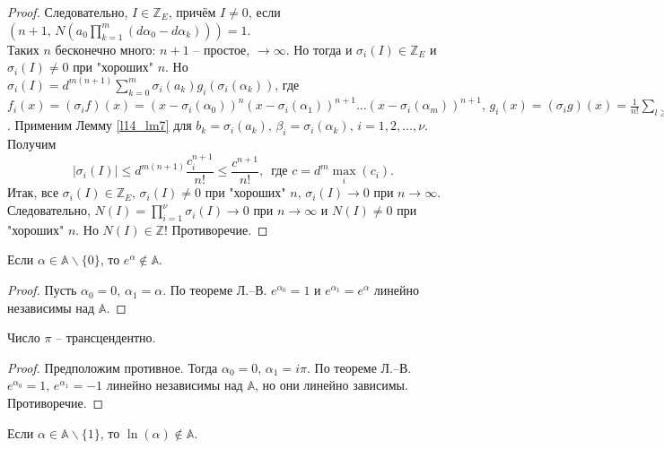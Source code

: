 \begin{proof}
	Следовательно, $I \in \mathbb{Z}_E$, причём $I \ne 0$, если $\displaystyle \left( n+1, \, N\left( a_0\prod\limits_{k=1}^m(d\alpha_0 - d\alpha_k) \right) \right) = 1$.\\
	Таких $n$ бесконечно много: $n+1$ -- простое, $\to \infty$. Но тогда и $\sigma_i(I) \in \mathbb{Z}_E$ и $\sigma_i(I) \ne 0$ при "хороших" $n$. Но $\displaystyle \sigma_i(I) = d^{m(n+1)} \sum\limits_{k=0}^m \sigma_i(a_k)g_i(\sigma_i(\alpha_k))$, где $f_i(x) = (\sigma_if)(x) = (x-\sigma_i(\alpha_0))^n(x-\sigma_i(\alpha_1))^{n+1}\dots(x-\sigma_i(\alpha_m))^{n+1}, \, g_i(x) = (\sigma_ig)(x) = \frac{1}{n!} \sum\limits_{l \geq n} f_i^{(l)}(x)$. 
	Применим Лемму \ref{l14_lm7} для $b_k = \sigma_i(a_k), \, \beta_i = \sigma_i(\alpha_k), \, i=1,2,\dots,\nu$. Получим
	$$\left| \sigma_i(I) \right| \leq d^{m(n+1)}\frac{c_i^{n+1}}{n!} \leq \frac{c^{n+1}}{n!}, \, \text{ где } c=d^m\max\limits_i(c_i).$$
	Итак, все $\sigma_i(I) \in \mathbb{Z}_E, \, \sigma_i(I) \ne 0$ при "хороших" $n, \, \sigma_i(I) \to 0$ при $n \to \infty$.\\
	Следовательно, $\displaystyle N(I) = \prod\limits_{i=1}^\nu \sigma_i(I) \to 0$ при $n \to \infty$ и $N(I) \ne 0$ при "хороших" $n$. Но $N(I) \in \mathbb{Z}$! 
	Противоречие.
\end{proof}

\begin{corollary}[из теоремы Л.--В.] \label{l14_cor1}
	Если $\alpha \in \mathbb{A} \backslash \{ 0 \}$, то $e^\alpha \not\in \mathbb{A}$.
\end{corollary}
\begin{proof}
	Пусть $\alpha_0 =0, \, \alpha_1=\alpha$. По теореме Л.--В. $e^{\alpha_0}=1$ и $e^{\alpha_1}=e^\alpha$ линейно независимы над $\mathbb{A}$.
\end{proof}

\begin{corollary} \label{l14_cor2}
	Число $\pi$ -- трансцендентно.
\end{corollary}
\begin{proof}
	Предположим противное. Тогда $\alpha_0 = 0, \, \alpha_1 = i\pi$. По теореме Л.--В. 
	$e^{\alpha_0} = 1, \, e^{\alpha_1} = -1$ линейно независимы над $\mathbb{A}$, но они линейно зависимы. 
	Противоречие.
\end{proof}

\begin{corollary} \label{l14_cor3}
	Если $\alpha \in \mathbb{A} \backslash \{ 1 \}$, то $\ln(\alpha) \not\in \mathbb{A}$.
\end{corollary}

